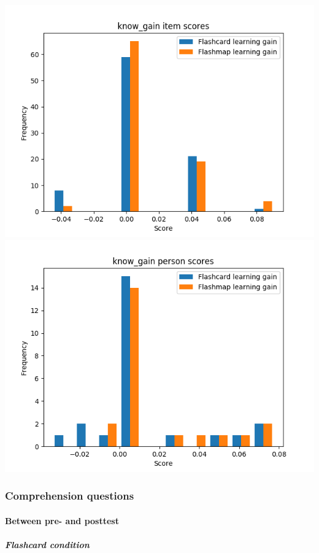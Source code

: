 \documentclass[]{article}
\begin{document}
\includegraphics{know_gain_diff.png}
\includegraphics{know_gain_abil.png}

\subsubsection{Comprehension questions}\label{comprehension-questions-1}

\FloatBarrier
\paragraph{Between pre- and posttest}\label{between-pre--and-posttest-1}

\FloatBarrier
\subparagraph{Flashcard condition}\label{flashcard-condition-1}
\end{document}
